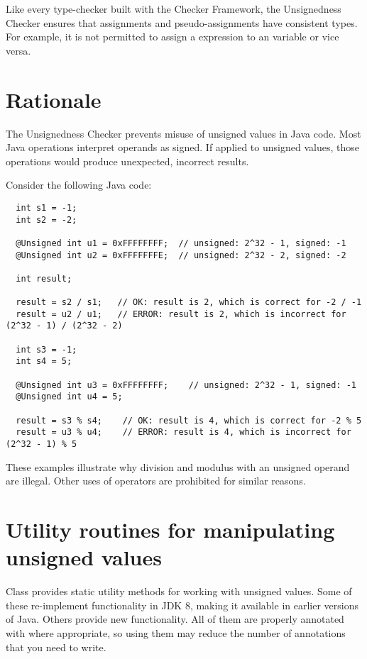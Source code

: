 Like every type-checker built with the Checker Framework, the Unsignedness
Checker ensures that assignments and pseudo-assignments have consistent types.
For example, it is not permitted to assign a  expression to an
 variable or vice versa.


\section{Rationale\label{unsignedness-checker-rationale}}

The Unsignedness Checker prevents misuse of unsigned values in Java code.
Most Java operations interpret operands as signed.  If applied to unsigned
values, those operations would produce unexpected, incorrect results.

Consider the following Java code:

\begin{Verbatim}
  int s1 = -1;
  int s2 = -2;

  @Unsigned int u1 = 0xFFFFFFFF;  // unsigned: 2^32 - 1, signed: -1
  @Unsigned int u2 = 0xFFFFFFFE;  // unsigned: 2^32 - 2, signed: -2

  int result;

  result = s2 / s1;   // OK: result is 2, which is correct for -2 / -1
  result = u2 / u1;   // ERROR: result is 2, which is incorrect for (2^32 - 1) / (2^32 - 2)

  int s3 = -1;
  int s4 = 5;

  @Unsigned int u3 = 0xFFFFFFFF;    // unsigned: 2^32 - 1, signed: -1
  @Unsigned int u4 = 5;

  result = s3 % s4;    // OK: result is 4, which is correct for -2 % 5
  result = u3 % u4;    // ERROR: result is 4, which is incorrect for (2^32 - 1) % 5
\end{Verbatim}

These examples illustrate why division and modulus with an unsigned operand
are illegal.  Other uses of operators are prohibited for similar reasons.


\section{Utility routines for manipulating unsigned values\label{unsignedness-utilities}}

Class  provides static
utility methods for working with unsigned values.  Some of these
re-implement functionality in JDK 8, making it available in earlier
versions of Java.  Others provide new functionality.  All of them are
properly annotated with 
where appropriate, so using them may reduce the number of annotations that
you need to write.
